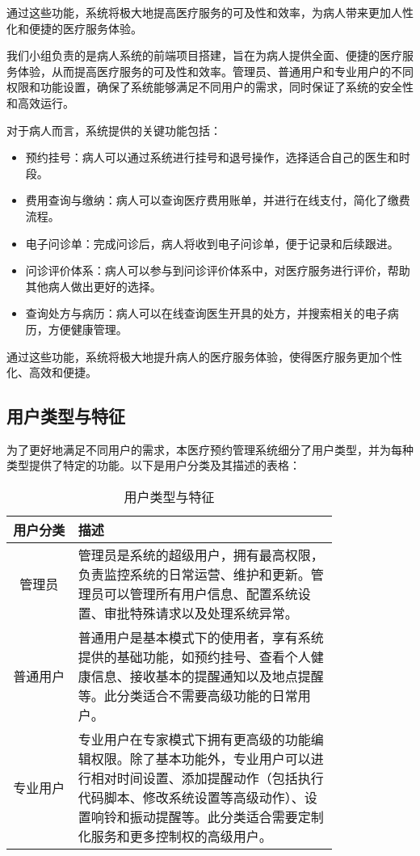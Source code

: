 通过这些功能，系统将极大地提高医疗服务的可及性和效率，为病人带来更加人性化和便捷的医疗服务体验。

我们小组负责的是病人系统的前端项目搭建，旨在为病人提供全面、便捷的医疗服务体验，从而提高医疗服务的可及性和效率。管理员、普通用户和专业用户的不同权限和功能设置，确保了系统能够满足不同用户的需求，同时保证了系统的安全性和高效运行。

对于病人而言，系统提供的关键功能包括：
\begin{itemize}
	\item 预约挂号：病人可以通过系统进行挂号和退号操作，选择适合自己的医生和时段。
	\item 费用查询与缴纳：病人可以查询医疗费用账单，并进行在线支付，简化了缴费流程。
	\item 电子问诊单：完成问诊后，病人将收到电子问诊单，便于记录和后续跟进。
	\item 问诊评价体系：病人可以参与到问诊评价体系中，对医疗服务进行评价，帮助其他病人做出更好的选择。
	\item 查询处方与病历：病人可以在线查询医生开具的处方，并搜索相关的电子病历，方便健康管理。
\end{itemize}

通过这些功能，系统将极大地提升病人的医疗服务体验，使得医疗服务更加个性化、高效和便捷。

\subsection{用户类型与特征}
为了更好地满足不同用户的需求，本医疗预约管理系统细分了用户类型，并为每种类型提供了特定的功能。以下是用户分类及其描述的表格：

	
\begin{table}[htbp]
	\centering
	\begin{tabular}{|c|p{0.8\linewidth}|} %
		\hline
		用户分类 & 描述 \\
		\hline
		管理员 & 管理员是系统的超级用户，拥有最高权限，负责监控系统的日常运营、维护和更新。管理员可以管理所有用户信息、配置系统设置、审批特殊请求以及处理系统异常。 \\
		\hline
		普通用户 & 普通用户是基本模式下的使用者，享有系统提供的基础功能，如预约挂号、查看个人健康信息、接收基本的提醒通知以及地点提醒等。此分类适合不需要高级功能的日常用户。 \\
		\hline
		专业用户 & 专业用户在专家模式下拥有更高级的功能编辑权限。除了基本功能外，专业用户可以进行相对时间设置、添加提醒动作（包括执行代码脚本、修改系统设置等高级动作）、设置响铃和振动提醒等。此分类适合需要定制化服务和更多控制权的高级用户。 \\
		\hline
	\end{tabular}
	\caption{用户类型与特征}
\end{table}


